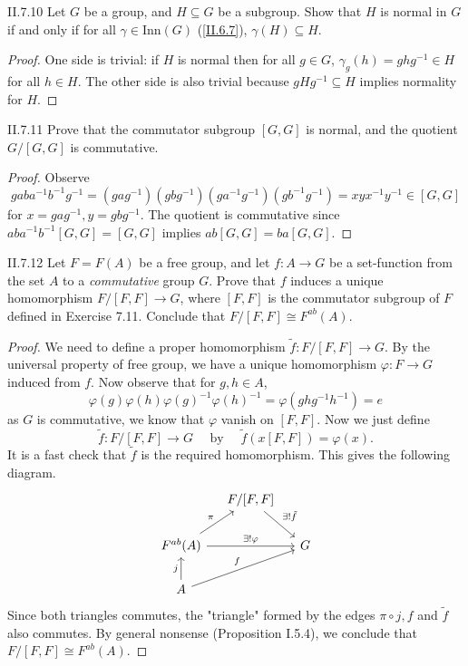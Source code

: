 \begin{problem}{II.7.10}
Let $G$ be a group, and $H \subseteq G$ be a subgroup. Show that $H$ is normal in $G$ if and only if for all $\gamma \in \text{Inn}(G)$ (\ref{II.6.7}), $\gamma(H) \subseteq H$.
\end{problem}
\begin{proof}
One side is trivial: if $H$ is normal then for all $g \in G$, $\gamma_g(h) = ghg^{-1} \in H$ for all $h \in H$. The other side is also trivial because $gHg^{-1} \subseteq H$ implies normality for $H$.
\end{proof}

\begin{problem}{II.7.11}
Prove that the commutator subgroup $[G,G]$ is normal, and the quotient $G/[G,G]$ is commutative.
\end{problem}
\begin{proof}
Observe
\[
gaba^{-1}b^{-1}g^{-1} = (gag^{-1})(gbg^{-1})(ga^{-1}g^{-1})(gb^{-1}g^{-1}) = xyx^{-1}y^{-1} \in [G,G]
\]
for $x = gag^{-1}, y = gbg^{-1}$. The quotient is commutative since $aba^{-1}b^{-1}[G,G] = [G,G]$ implies $ab[G,G] = ba[G,G]$.
\end{proof}

\begin{problem}{II.7.12}
Let $F=F(A)$ be a free group, and let $f:A \to G$ be a set-function from the set $A$ to a \emph{commutative} group $G$. Prove that $f$ induces a unique homomorphism $F/[F,F] \to G$, where $[F,F]$ is the commutator subgroup of $F$ defined in Exercise 7.11. Conclude that $F/[F,F] \cong F^{ab}(A)$.	
\end{problem}
\begin{proof}
We need to define a proper homomorphism $\tilde{f} : F/[F,F] \to G$. By the universal property of free group, we have a unique homomorphism $\varphi : F \to G$ induced from $f$. Now observe that for $g,h \in A$, 
$$
\varphi(g)\varphi(h)\varphi(g)^{-1}\varphi(h)^{-1} = \varphi(ghg^{-1}h^{-1}) = e
$$
as $G$ is commutative, we know that $\varphi$ vanish on $[F,F]$. Now we just define
$$
\tilde{f} : F/[F,F] \to G \quad \text{ by } \quad \tilde{f}(x[F,F]) = \varphi(x).
$$
It is a fast check that $\tilde{f}$ is the required homomorphism. This gives the following diagram.
\[
\begin{tikzcd}[column sep=small]
& {F/[F,F]} \arrow[rd, "\exists ! \tilde{f}"] &   \\
F^{ab}(A) \arrow[ru, "\pi"] \arrow[rr, "\exists ! \varphi"] &                                             & G \\
A \arrow[rru, "f"] \arrow[u, "j"]                           &                                             &  
\end{tikzcd}	
\]
Since both triangles commutes, the "triangle" formed by the edges $\pi \circ j, f$ and $\tilde{f}$ also commutes. By general nonsense (Proposition I.5.4), we conclude that $F/[F,F] \cong F^{ab}(A)$.
\end{proof}

